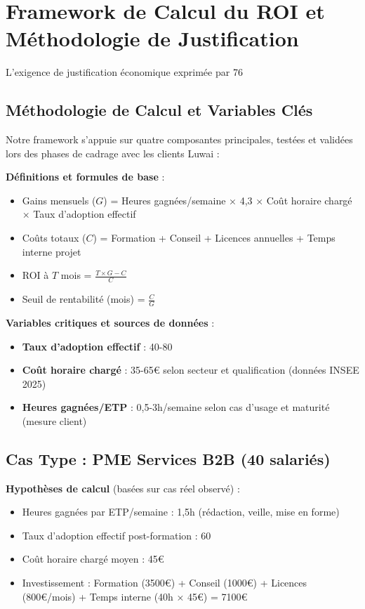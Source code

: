 \section{Framework de Calcul du ROI et Méthodologie de Justification}
\label{sec:roi_framework}

L'exigence de justification économique exprimée par 76%

\subsection{Méthodologie de Calcul et Variables Clés}

Notre framework s'appuie sur quatre composantes principales, testées et validées lors des phases de cadrage avec les clients Luwai :

\textbf{Définitions et formules de base} :
\begin{itemize}
    \item Gains mensuels (\(G\)) = Heures gagnées/semaine × 4,3 × Coût horaire chargé × Taux d'adoption effectif
    \item Coûts totaux (\(C\)) = Formation + Conseil + Licences annuelles + Temps interne projet
    \item ROI à \(T\) mois = \(\frac{T \times G - C}{C}\)
    \item Seuil de rentabilité (mois) = \(\frac{C}{G}\)
\end{itemize}

\textbf{Variables critiques et sources de données} :
\begin{itemize}
    \item \textbf{Taux d'adoption effectif} : 40-80%
    \item \textbf{Coût horaire chargé} : 35-65€ selon secteur et qualification (données INSEE 2025)
    \item \textbf{Heures gagnées/ETP} : 0,5-3h/semaine selon cas d'usage et maturité (mesure client)
\end{itemize}

\subsection{Cas Type : PME Services B2B (40 salariés)}

\textbf{Hypothèses de calcul} (basées sur cas réel observé) :
\begin{itemize}
    \item Heures gagnées par ETP/semaine : 1,5h (rédaction, veille, mise en forme)
    \item Taux d'adoption effectif post-formation : 60%
    \item Coût horaire chargé moyen : 45€
    \item Investissement : Formation (3500€) + Conseil (1000€) + Licences (800€/mois) + Temps interne (40h × 45€) = 7100€
\end{itemize}

